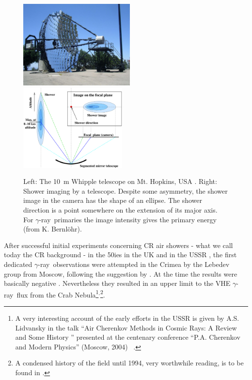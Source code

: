 \documentclass{svjour3x}                     %
\newcommand{\gr}{$\gamma$-ray}
\newcommand{\byKB}{ (from K. Bernl\"ohr)}
\begin{document}
\begin{figure}
  \includegraphics[width=0.52\textwidth]{Whipple_telescope_x.eps}
  \includegraphics[width=0.48\textwidth]{imaging_en.eps}
  \caption[Whipple telescope]{Left: The 10~m Whipple telescope on Mt. Hopkins, 
    USA \cite{whipplepic}.  
    Right: Shower
    imaging by a telescope. Despite some asymmetry, the shower image in the
    camera has the shape of an ellipse. The shower direction is a point somewhere 
    on the extension of its major axis.
    For \gr\ primaries the image intensity gives
    the primary energy\byKB.}
\label{fig:5.2}       %
\label{fig:6.1}       %
\end{figure}
%

After successful initial experiments concerning CR air showers - what we call
today the CR background - in the 50ies in the UK \cite{galbraith53} and in the
USSR \cite{nesterova55}, the first dedicated \gr\ observations were attempted
in the Crimea by the Lebedev group from Moscow, following the suggestion by
\cite{zatsepin61}. At the time the results were basically negative
\cite{chudakov64}. Nevertheless they resulted in an upper limit to the VHE 
\gr\ flux from the Crab Nebula\footnote{A very interesting account of the early
  efforts in the USSR is given by A.S. Lidvansky in the talk ``Air Cherenkov
  Methods in Cosmic Rays: A Review and Some History '' presented at the
  centenary conference ``P.A. Cherenkov and Modern Physics'' (Moscow, 2004)~
  \cite{lidvansky06}.}$^,$\footnote{A condensed history of the field until 1994,
  very worthwhile reading, is to be found in \cite{weekes96}.}.
\end{document}

